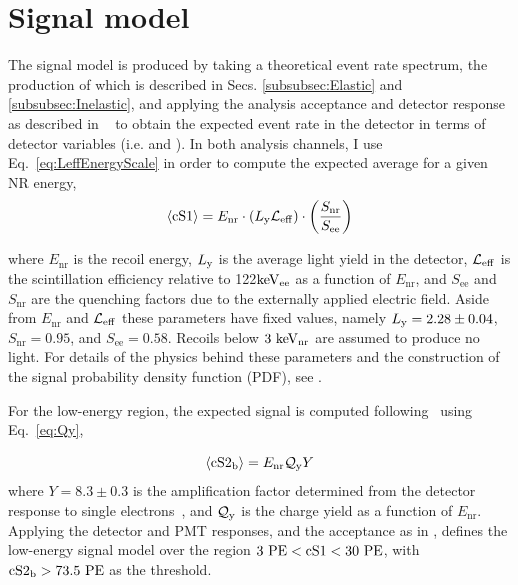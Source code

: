 \section{Signal model}
\label{subsec:SignalModel}
The signal model is produced by taking a theoretical event rate spectrum, the production of which is described in Secs. \ref{subsubsec:Elastic} and \ref{subsubsec:Inelastic}, and applying the analysis acceptance and detector response as described in ~\cite{Aprile:2012vw}  to obtain the expected event rate in the detector in terms of detector variables (i.e. \cSi{} and \cSiib{}). 
In both analysis channels, I use Eq.~\ref{eq:LeffEnergyScale} in order to compute the expected average \cSi{} for a given NR energy,
\begin{equation}
\label{eq:LeffEnergyScale}
	\langle \mathrm{cS1} \rangle = E_{\mathrm{nr}} \cdot (L_{\mathrm{y}} \mathcal{L}_{\mathrm{eff}}) \cdot   \left(\frac{S_\mathrm{nr}}{S_\mathrm{ee}}\right) 
\end{equation}

where $E_\mathrm{nr}$ is the recoil energy, $L_{\mathrm{y}}$ is the average light yield in the detector, $\mathcal{L}_{\mathrm{eff}}$ is the scintillation efficiency relative to 122$\mathrm{keV_\mathrm{ee}}$ as a function of $E_\mathrm{nr}$, and $S_\mathrm{ee}$ and $S_\mathrm{nr}$ are the quenching factors due to the externally applied electric field. Aside from $E_\mathrm{nr}$ and $\mathcal{L}_{\mathrm{eff}}$ these parameters have fixed values, namely $L_{\mathrm{y}} = 2.28 \pm 0.04$, $S_\mathrm{nr} = 0.95$, and $S_\mathrm{ee} = 0.58$. Recoils below $3~\mathrm{keV_\mathrm{nr}}$ are assumed to produce no light. For details of the physics behind these parameters and the construction of the signal probability density function (PDF), see \cite{Aprile:2012vw,xe100_run_combination}. 

For the low-energy region, the expected \cSiib{} signal is computed following~\cite{DataMCXenon} using Eq.~\ref{eq:Qy},


\begin{equation}
\label{eq:Qy}
	\langle \mathrm{cS2}_\mathrm{b} \rangle = E_{\mathrm{nr}}\mathcal{Q}_{\mathrm{y}} Y   
\end{equation}
where $Y = 8.3 \pm 0.3$ 
is the amplification factor determined from the detector response to single electrons~\cite{XenonSingleElectron}, and $\mathcal{Q}_{\mathrm{y}}$ is the charge yield as a function of $E_\mathrm{nr}$. Applying the detector and PMT responses, and the acceptance as in \cite{xe100_run_combination}, defines the low-energy signal model over the region $3~\mathrm{PE} < \mathrm{cS1}{} < 30~\mathrm{PE}$, with $\mathrm{cS2}_\mathrm{b}{} > 73.5~\mathrm{PE}$ as the \Sii{} threshold.

